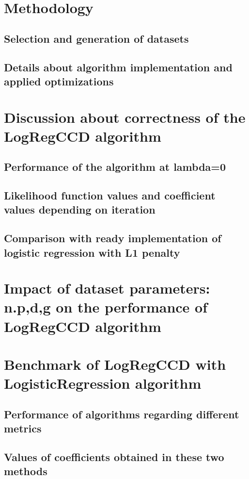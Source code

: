 \documentclass[12pt]{article}
\begin{document}
\section{Methodology}

\subsection{Selection and generation of datasets}

\subsection{Details about algorithm implementation and applied optimizations}

\section{Discussion about correctness of the LogRegCCD algorithm}

\subsection{Performance of the algorithm at lambda=0}

\subsection{Likelihood function values and coefficient values depending on iteration}

\subsection{Comparison with ready implementation of logistic regression with L1 penalty}

\section{Impact of dataset parameters: n.p,d,g on the performance of LogRegCCD algorithm}

\section{Benchmark of LogRegCCD with LogisticRegression algorithm}

\subsection{Performance of algorithms regarding different metrics}

\subsection{Values of coefficients obtained in these two methods}



\clearpage 
\listoffigures
\listoftables
\printbibliography
\end{document}
